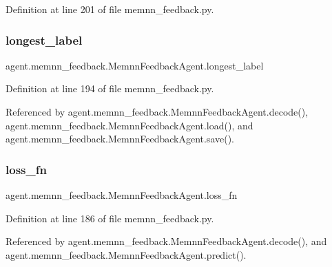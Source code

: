 Definition at line 201 of file memnn\+\_\+feedback.\+py.

\mbox{\label{classagent_1_1memnn__feedback_1_1MemnnFeedbackAgent_abf7ccf8c4b95dd749e241f2993a699b1}} 
\subsubsection{\texorpdfstring{longest\+\_\+label}{longest\_label}}
{\footnotesize\ttfamily agent.\+memnn\+\_\+feedback.\+Memnn\+Feedback\+Agent.\+longest\+\_\+label}



Definition at line 194 of file memnn\+\_\+feedback.\+py.



Referenced by agent.\+memnn\+\_\+feedback.\+Memnn\+Feedback\+Agent.\+decode(), agent.\+memnn\+\_\+feedback.\+Memnn\+Feedback\+Agent.\+load(), and agent.\+memnn\+\_\+feedback.\+Memnn\+Feedback\+Agent.\+save().

\mbox{\label{classagent_1_1memnn__feedback_1_1MemnnFeedbackAgent_a634e55015bc44025c24a34ec11f5945d}} 
\subsubsection{\texorpdfstring{loss\+\_\+fn}{loss\_fn}}
{\footnotesize\ttfamily agent.\+memnn\+\_\+feedback.\+Memnn\+Feedback\+Agent.\+loss\+\_\+fn}



Definition at line 186 of file memnn\+\_\+feedback.\+py.



Referenced by agent.\+memnn\+\_\+feedback.\+Memnn\+Feedback\+Agent.\+decode(), and agent.\+memnn\+\_\+feedback.\+Memnn\+Feedback\+Agent.\+predict().

